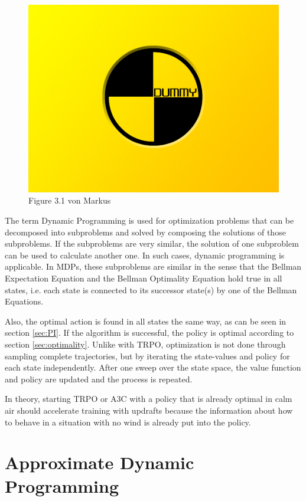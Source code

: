 \begin{figure}[h]
	\includegraphics[width=\textwidth]{src/pics/dummy.jpg}
	\caption{Figure 3.1 von Markus}
	\label{fig:model-based-model-free} 
\end{figure}

The term Dynamic Programming is used for optimization problems that can be decomposed into subproblems and solved by composing the solutions of those subproblems. If the subproblems are very similar, the solution of one subproblem can be used to calculate another one. In such cases, dynamic programming is applicable. In MDPs, these subproblems are similar in the sense that the Bellman Expectation Equation and the Bellman Optimality Equation hold true in all states, i.e. each state is connected to its successor state(s) by one of the Bellman Equations.

Also, the optimal action is found in all states the same way, as can be seen in section \ref{sec:PI}. If the algorithm is successful, the policy is optimal according to section \ref{sec:optimality}. Unlike with TRPO, optimization is not done through sampling complete trajectories, but by iterating the state-values and policy for each state independently. After one sweep over the state space, the value function and policy are updated and the process is repeated.\bigbreak

In theory, starting TRPO or A3C with a policy that is already optimal in calm air should accelerate training with updrafts because the information about how to behave in a situation with no wind is already put into the policy.

\section{Approximate Dynamic Programming}

